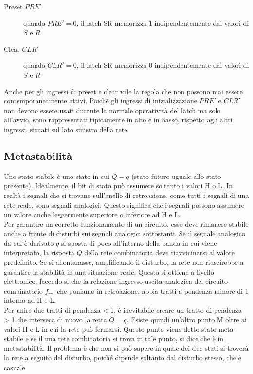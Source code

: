 \documentclass{subfiles}
\begin{document}
\begin{description}
    \item[Preset $PRE'$] quando $PRE'=0$, il latch SR memorizza $1$ indipendentemente dai valori di $S$ e $R$
    \item[Clear $CLR'$] quando $CLR'=0$, il latch SR memorizza $0$ indipendentemente dai valori di $S$ e $R$
\end{description}

Anche per gli ingressi di preset e clear vale la regola che non possono mai essere contemporaneamente attivi.
Poiché gli ingressi di inizializzazione $PRE'$ e $CLR'$ non devono essere usati durante la normale operatività del latch ma solo all'avvio, sono rappresentati tipicamente in alto e in basso, rispetto agli altri ingressi, situati sul lato sinistro della rete.

\subsection{Metastabilità}

Uno stato stabile è uno stato in cui $Q=q$ (stato futuro uguale allo stato presente).
Idealmente, il bit di stato può assumere soltanto i valori H o L.
In realtà i segnali che si trovano sull'anello di retroazione, come tutti i segnali di una rete reale, sono segnali analogici.
Questo significa che i segnali possono assumere un valore anche leggermente superiore o inferiore ad H e L.\\

\noindent
Per garantire un corretto funzionamento di un circuito, esso deve rimanere stabile anche a fronte di disturbi sui segnali analogici sottostanti.
Se il segnale analogico da cui è derivato $q$ si sposta di poco all'interno della banda in cui viene interpretato, la risposta $Q$ della rete combinatoria deve riavvicinarsi al valore predefinito.
Se si allontanasse, amplificando il disturbo, la rete non riuscirebbe a garantire la stabilità in una situazione reale.
Questo si ottiene a livello elettronico, facendo si che la relazione ingresso-uscita analogica del circuito combinatorio $f_{rc}$, che poniamo in retroazione, abbia tratti a pendenza minore di 1 intorno ad H e L.\\

\noindent
Per unire due tratti di pendenza < 1, è inevitabile creare un tratto di pendenza > 1 che interseca di nuovo la retta $Q = q$.
Esiste quindi un'altro punto M oltre ai valori H e L in cui la rete può fermarsi.
Questo punto viene detto stato meta-stabile e se il una rete combinatoria si trova in tale punto, si dice che è in metastabilità.
Il problema è che non si può sapere in quale dei due stati si troverà la rete a seguito del disturbo, poiché dipende soltanto dal disturbo stesso, che è casuale.\\
\end{document}
